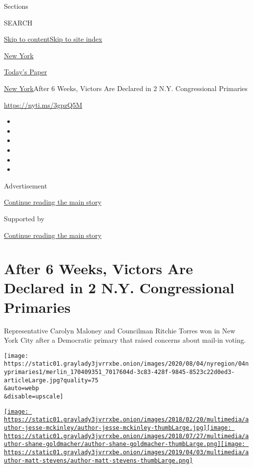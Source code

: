 Sections

SEARCH

\protect\hyperlink{site-content}{Skip to
content}\protect\hyperlink{site-index}{Skip to site index}

\href{https://www.nytimes3xbfgragh.onion/section/nyregion}{New York}

\href{https://myaccount.nytimes3xbfgragh.onion/auth/login?response_type=cookie\&client_id=vi}{}

\href{https://www.nytimes3xbfgragh.onion/section/todayspaper}{Today's
Paper}

\href{/section/nyregion}{New York}\textbar{}After 6 Weeks, Victors Are
Declared in 2 N.Y. Congressional Primaries

\url{https://nyti.ms/3gpzQ5M}

\begin{itemize}
\item
\item
\item
\item
\item
\item
\end{itemize}

Advertisement

\protect\hyperlink{after-top}{Continue reading the main story}

Supported by

\protect\hyperlink{after-sponsor}{Continue reading the main story}

\hypertarget{after-6-weeks-victors-are-declared-in-2-ny-congressional-primaries}{%
\section{After 6 Weeks, Victors Are Declared in 2 N.Y. Congressional
Primaries}\label{after-6-weeks-victors-are-declared-in-2-ny-congressional-primaries}}

Representative Carolyn Maloney and Councilman Ritchie Torres won in New
York City after a Democratic primary that raised concerns about mail-in
voting.

\texttt{[image: https://static01.graylady3jvrrxbe.onion/images/2020/08/04/nyregion/04nyprimaries1/merlin\_170409351\_7017604d-3c83-428f-9845-8523c22d0ed3-articleLarge.jpg?quality=75\\\&auto=webp\\\&disable=upscale]}

\href{https://www.nytimes3xbfgragh.onion/by/jesse-mckinley}{\texttt{[image: https://static01.graylady3jvrrxbe.onion/images/2018/02/20/multimedia/author-jesse-mckinley/author-jesse-mckinley-thumbLarge.jpg]}}\href{https://www.nytimes3xbfgragh.onion/by/shane-goldmacher}{\texttt{[image: https://static01.graylady3jvrrxbe.onion/images/2018/07/27/multimedia/author-shane-goldmacher/author-shane-goldmacher-thumbLarge.png]}}\href{https://www.nytimes3xbfgragh.onion/by/matt-stevens}{\texttt{[image: https://static01.graylady3jvrrxbe.onion/images/2019/04/03/multimedia/author-matt-stevens/author-matt-stevens-thumbLarge.png]}}

